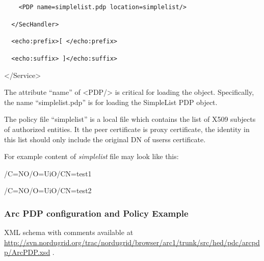 \documentclass{article}
\begin{document}
{\upshape\color{black}
\texttt{\ \ \ \ {\textless}PDP
name={\textquotedbl}}\texttt{simplelist}\texttt{.pdp{\textquotedbl}}\texttt{
location=}\texttt{{\textquotedbl}}\texttt{simplelist}\texttt{{\textquotedbl}}\texttt{/}\texttt{{\textgreater}}}

{\upshape\color{black}
\texttt{\ \ }\foreignlanguage{spanish}{\texttt{{\textless}/SecHandler{\textgreater}}}}

{\upshape\color{black}
\foreignlanguage{spanish}{\texttt{\ \ }}\foreignlanguage{spanish}{\texttt{{\textless}echo:prefix{\textgreater}[
{\textless}/echo:prefix{\textgreater}}}}

{\upshape\color{black}
\foreignlanguage{spanish}{\texttt{\ \ }}\texttt{{\textless}echo:suffix{\textgreater}
]{\textless}/echo:suffix{\textgreater}}}

{\ttfamily\color{black}
{\textless}/Service{\textgreater}}

{\color{black}
The attribute {\textquotedblleft}name{\textquotedblright} of
{\textless}PDP/{\textgreater} is critical for loading the object.
Specifically, the name
{\textquotedblleft}simplelist.pdp{\textquotedblright} is for loading
the SimpleList PDP object.}

{\upshape\color{black}
The policy file {\textquotedblleft}simplelist{\textquotedblright} is a
local file which contains the list of X509 subjects of authorized
entities. It the peer certificate is proxy certificate, the identity in
this list should only include the original DN of
users{\textquotesingle}s certificate.}

{\upshape\color{black}
For example content of \textit{simplelist} file may look like this:}

{\color{black}
/C=NO/O=UiO/CN=test1}

{\color{black}
/C=NO/O=UiO/CN=test2}

\subsubsection[Arc PDP configuration and Policy Example]{Arc PDP
configuration and Policy Example}
\label{bkm:Ref204009974}\label{bkm:RefSecarcpdpconfigandpolicy}{\upshape\color{black}
XML schema with comments available at
\url{http://svn.nordugrid.org/trac/nordugrid/browser/arc1/trunk/src/hed/pdc/arcpdp/ArcPDP.xsd}
.}
\end{document}
